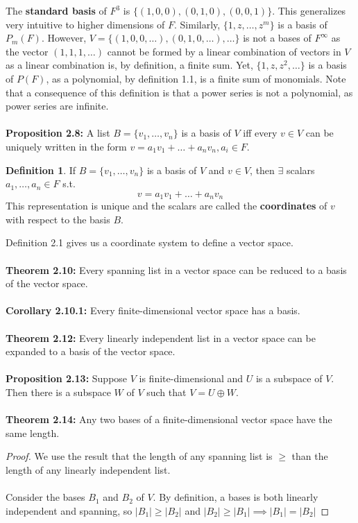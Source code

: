 \documentclass{article}
\theoremstyle{definition}
\newtheorem{defin}{Definition}[section]
\begin{document}
The \textbf{standard basis} of $F^3$ is $\{(1, 0, 0), (0, 1, 0), (0, 0, 1)\}$. This generalizes very intuitive to higher dimensions of $F$. Similarly, $\{1, z, \dots, z^m\}$ is a basis of $P_m(F)$. However, $V = \{(1, 0, 0, \dots), (0, 1, 0, \dots), \dots\}$ is not a bases of $F^\infty$ as the vector $(1, 1, 1, \dots)$ cannot be formed by a linear combination of vectors in $V$ as a linear combination is, by definition, a finite sum. Yet, $\{1, z, z^2, \dots\}$ is a basis of $P(F)$, as a polynomial, by definition 1.1, is a finite sum of monomials. Note that a consequence of this definition is that a power series is not a polynomial, as power series are infinite. \\ \\
\textbf{Proposition 2.8:} A list $B = \{v_1, \dots, v_n\}$ is a basis of $V$ iff every $v \in V$ can be uniquely written in the form $v = a_1v_1 + \dots + a_nv_n, a_i \in F$.
\begin{defin}
If $B = \{v_1, \dots, v_n\}$ is a basis of $V$ and $v \in V$, then $\exists$ scalars $a_1, \dots, a_n \in F$ s.t. $$v = a_1v_1 + \dots + a_n v_n$$ This representation is unique and the scalars are called the \textbf{coordinates} of $v$ with respect to the basis $B$.
\end{defin}
\noindent Definition 2.1 gives us a coordinate system to define a vector space. \\ \\
\textbf{Theorem 2.10:} Every spanning list in a vector space can be reduced to a basis of the vector space. \\ \\
\textbf{Corollary 2.10.1:} Every finite-dimensional vector space has a basis. \\ \\
\textbf{Theorem 2.12:} Every linearly independent list in a vector space can be expanded to a basis of the vector space. \\ \\
\textbf{Proposition 2.13:} Suppose $V$ is finite-dimensional and $U$ is a subspace of $V$. Then there is a subspace $W$ of $V$ such that $V = U \oplus W$. \\ \\
\textbf{Theorem 2.14:} Any two bases of a finite-dimensional vector space have the same length. 
\begin{proof}
We use the result that the length of any spanning list is $\geq$ than the length of any linearly independent list. \\ \\
Consider the bases $B_1$ and $B_2$ of $V$. By definition, a bases is both linearly independent and spanning, so $|B_1| \geq |B_2|$ and $|B_2| \geq |B_1| \implies |B_1| = |B_2|$
\end{proof}
\end{document}
